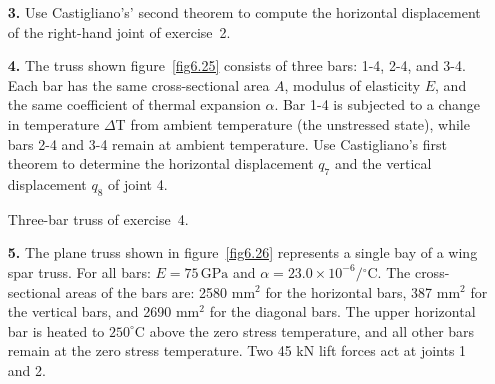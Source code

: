 \documentclass{AeroStructure-ERJohnson}
\begin{document}
\begin{exercise}
\begin{enumerate}[\textbf{2.}]
{\caption{Six-bar truss for exercises 2 and 3.\label{fig6.24}}}

\item[\textbf{3.}] Use Castigliano's’ second theorem to compute the horizontal displacement of the right-hand joint of exercise~2.

\item[\textbf{4.}] The truss shown figure~\ref{fig6.25} consists of three bars: 1-4, 2-4, and 3-4. Each bar has the same cross-sectional area $A$, modulus of elasticity $E$, and the same coefficient of thermal expansion $\alpha$. Bar 1-4 is subjected to a change in temperature $\Delta$T from ambient temperature (the unstressed state), while bars 2-4 and 3-4 remain at ambient temperature. Use Castigliano's first theorem to determine the horizontal displacement $q_7$ and the vertical displacement $q_8$ of joint 4.

{\def\floatbelowskip{-3pt}%
{\caption{Three-bar truss of exercise~4.\label{fig6.25}}}}

\item[\textbf{5.}] The plane truss shown in figure~\ref{fig6.26} represents a single bay of a wing spar truss. For all bars: $E=75\,\mathrm{GPa}$ and $\alpha=23.0 \times 10^{-6} /{ }^{\circ} \mathrm{C}$. The cross-sectional areas of the bars are: 2580 mm$^2$ for the horizontal bars,\vadjust{\vspace*{10pt}\pagebreak} 387 mm$^2$ for the vertical bars, and 2690 mm$^2$ for the diagonal bars. The upper horizontal bar is heated to $250^{\circ} \mathrm{C}$ above the zero stress temperature, and all other bars remain at the zero stress temperature. Two 45 kN lift forces act at joints 1 and 2.


\end{enumerate}
\end{exercise}
\end{document}
